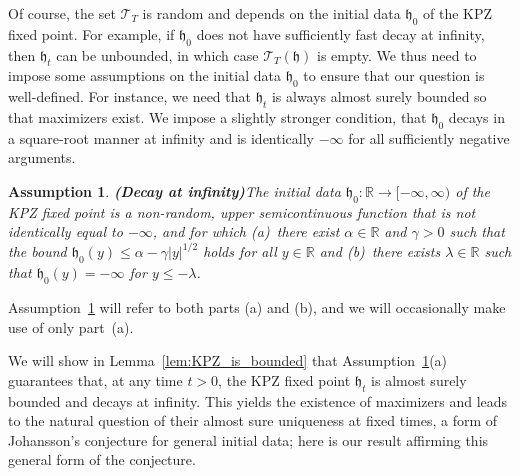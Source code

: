 \documentclass[oneside,final,11pt]{amsart}
\newtheorem{assump}[thm]{Assumption}
\theoremstyle{definition}
\newcounter{assum}
\newcommand{\thmtitle}[1]{{\bf(#1)}}
\newcommand{\fh}{\mathfrak{h}}
\newcommand{\R}{\mathbb{R}}
\newcommand{\CT}{\mathcal{T}}
\newcommand{\1}[1]{\mathbf{1}_{#1}}
\newcommand{\ah}[1]{\marginnote{\tiny{\color{green!65!black}[AH: #1]}}}
\numberwithin{equation}{section}
\begin{document}
Of course, the set $\CT_T$ is random and depends on the initial data $\fh_0$ of the KPZ fixed point. For example, if $\fh_0$ does not have sufficiently fast decay at infinity, then $\fh_t$ can be unbounded, in which case $\CT_{T}(\fh)$ is empty.
We thus need to impose some assumptions on the initial data $\fh_0$ to ensure that our question is well-defined. For instance, we need that $\fh_t$ is always almost surely bounded so that maximizers exist. We impose a slightly stronger condition, that $\fh_0$ decays in a square-root manner at infinity and is identically $-\infty$ for all sufficiently negative arguments.

\begin{assump}\thmtitle{Decay at infinity}\label{a:initial_state_pd} %
The initial data $\fh_0 : \R \to [-\infty, \infty)$ of the KPZ fixed point is a non-random, upper semicontinuous function that is not identically equal to $-\infty$, and for which (a)~there exist $\alpha\in\R$ and $\gamma>0$ such that the bound $\fh_0(y) \leq \alpha - \gamma |y|^{1/2}$ holds for all $y \in \R$ and (b)~there exists $\lambda \in \R$ such that $\fh_0(y) = -\infty$ for $y\leq -\lambda$.
\end{assump}


\noindent Assumption~\ref{a:initial_state_pd} will refer to both parts (a) and (b), and we will occasionally make use of only part~(a).

We will show in Lemma~\ref{lem:KPZ_is_bounded} that Assumption~\ref{a:initial_state_pd}(a) guarantees that, at any time $t > 0$, the KPZ fixed point $\fh_t$ is
almost surely bounded and decays at infinity. This yields the existence of maximizers and leads to the natural question of their almost sure uniqueness at fixed times, a form of Johansson's conjecture for general initial data; here is our result affirming this general form of the conjecture.
\end{document}
